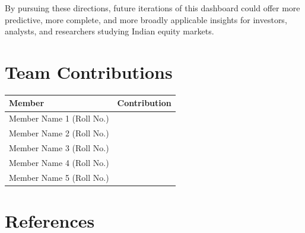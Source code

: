 \documentclass[14pt,a4paper]{extreport}
\begin{document}
By pursuing these directions, future iterations of this dashboard could
offer more predictive, more complete, and more broadly applicable insights
for investors, analysts, and researchers studying Indian equity markets.

\chapter{Team Contributions}

\begin{center}
\begin{tabular}{p{4cm} p{9cm}}
\toprule
\textbf{Member} & \textbf{Contribution} \\
\midrule
Member Name 1 (Roll No.) & \\[4mm]
Member Name 2 (Roll No.) & \\[4mm]
Member Name 3 (Roll No.) & \\[4mm]
Member Name 4 (Roll No.) & \\[4mm]
Member Name 5 (Roll No.) & \\[4mm]
\bottomrule
\end{tabular}
\end{center}

\chapter{References}
\end{document}

